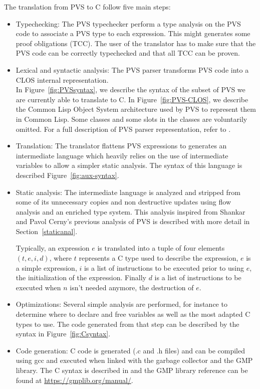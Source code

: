 \documentclass[12pt,a4paper]{article}
\begin{document}
The translation from PVS \cite{PVS:manuals} to C follow five main steps:
\begin{itemize}
\item Typechecking: The PVS typechecker \cite{PVS:userguide} perform a type analysis on the PVS code to associate a PVS type to each expression. This might generates some proof obligations (TCC). The user of the translator has to make sure that the PVS code can be correctly typechecked and that all TCC can be proven.

\item Lexical and syntactic analysis: The PVS parser transforms PVS \cite{PVS:language} code into a CLOS internal representation. \\

In Figure~\ref{fig:PVSsyntax}, we describe the syntax of the subset of PVS we are currently able to translate to C.
In Figure~\ref{fig:PVS-CLOS}, we describe the Common Lisp Object System architecture used by PVS to represent them in Common Lisp. Some classes and some slots in the classes are voluntarily omitted. For a full description of PVS parser representation, refer to \cite{PVS:api}.

\item Translation: The translator flattens PVS expressions to generates an intermediate language which heavily relies on the use of intermediate variables to allow a simpler static analysis. The syntax of this language is described Figure~\ref{fig:aux-syntax}.

\item Static analysis: The intermediate language is analyzed and stripped from some of its unnecessary copies and non destructive updates using flow analysis and an enriched type system. This analysis inspired from Shankar \cite{shankar02} and Pavol Cerny's \cite{pavol} previous analysis of PVS is described with more detail in Section~\ref{staticanal}.

Typically, an expression $e$ is translated into a tuple of four elements $(t,e,i,d)$, where $t$ represents a C type used to describe the expression, $e$ is a simple expression, $i$ is a list of instructions to be executed prior to using $e$, the initialization of the expression. Finally $d$ is a list of instructions to be executed when $n$ isn't needed anymore, the destruction of $e$.

\item Optimizations: Several simple analysis are performed, for instance to determine where to declare and free variables as well as the most adapted C types to use. The code generated from that step can be described by the syntax in Figure~\ref{fig:Csyntax}.

\item Code generation: C code is generated (.c and .h files) and can be compiled using gcc and executed when linked with the garbage collector and the GMP library. The C syntax is described in \cite{huss2004c} and the GMP library reference can be found at \href{https://gmplib.org/manual/}{https://gmplib.org/manual/}.
\end{itemize}
\end{document}
